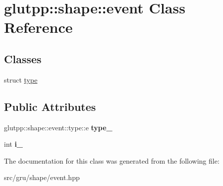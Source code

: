 \hypertarget{classglutpp_1_1shape_1_1event}{\section{glutpp\-:\-:shape\-:\-:event \-Class \-Reference}
\label{classglutpp_1_1shape_1_1event}
}
\subsection*{\-Classes}
\begin{DoxyCompactItemize}
\item 
struct \hyperlink{structglutpp_1_1shape_1_1event_1_1type}{type}
\end{DoxyCompactItemize}
\subsection*{\-Public \-Attributes}
\begin{DoxyCompactItemize}
\item 
\hypertarget{classglutpp_1_1shape_1_1event_af0ccc0ef2ab93db722964bfd8012a9eb}{glutpp\-::shape\-::event\-::type\-::e {\bfseries type\-\_\-}}\label{classglutpp_1_1shape_1_1event_af0ccc0ef2ab93db722964bfd8012a9eb}

\item 
\hypertarget{classglutpp_1_1shape_1_1event_aedc6bd32e33dddd86846241d91f50f8a}{int {\bfseries i\-\_\-}}\label{classglutpp_1_1shape_1_1event_aedc6bd32e33dddd86846241d91f50f8a}

\end{DoxyCompactItemize}


\-The documentation for this class was generated from the following file\-:\begin{DoxyCompactItemize}
\item 
src/gru/shape/event.\-hpp\end{DoxyCompactItemize}
